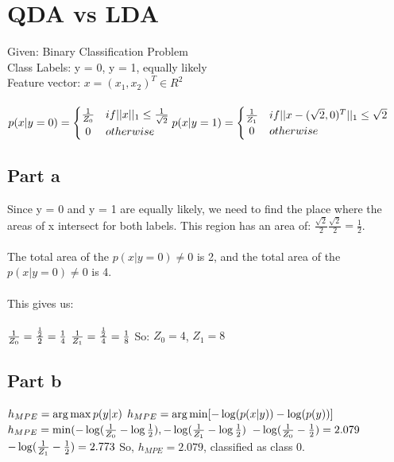 \documentclass[paper=a4, fontsize=11pt]{scrartcl} %
\numberwithin{equation}{section} %
\numberwithin{figure}{section} %
\numberwithin{table}{section} %
\begin{document}
	\section{QDA vs LDA}
	Given:
	Binary Classification Problem\\
	Class Labels: y = 0, y = 1, equally likely\\
	Feature vector: $x = (x_1, x_2)^T \in R^2$\\\\
	$
	p(x|y=0) = 
	\begin{cases}
		\hfill \frac{1}{Z_0} \hfill & if ||x||_1 \leq \frac{1}{\sqrt{2}}\\
		\hfill 0 \hfill & otherwise \\
	\end{cases}
	\\\\p(x|y=1) = 
	\begin{cases}
		\hfill \frac{1}{Z_1} \hfill & if ||x-(\sqrt{2},0)^T||_1 \leq \sqrt{2}\\
		\hfill 0 \hfill & otherwise 
	\end{cases}
	$
	
	\subsection{Part a}
	
	Since y = 0 and y = 1 are equally likely, we need to find the place where the areas of x intersect for both labels. This region has an area of: $\frac{\sqrt{2}}{2}\frac{\sqrt{2}}{2} = \frac{1}{2}$.\\\\
	The total area of the $p(x|y=0) \ne 0$ is 2, and the total area of the $p(x|y=0) \ne 0$ is 4.\\\\
	This gives us:\\\\
	$\frac{1}{Z_0} = \frac{\frac{1}{2}}{2} = \frac{1}{4}\\\\$
	$\frac{1}{Z_1} = \frac{\frac{1}{2}}{4} = \frac{1}{8}\\\\$
	So: $Z_0 = 4$, $Z_1 = 8$
		
	\subsection{Part b}
	$h_{MPE} = \arg\max p(y|x)\\\\$
	$h_{MPE} = \arg \min[-\log(p(x|y)) - \log(p(y))]\\\\$
	$h_{MPE} = \min(-\log(\frac{1}{Z_0}-\log\frac{1}{2}), -\log(\frac{1}{Z_1}-\log\frac{1}{2})\\\\$
	$-\log(\frac{1}{Z_0}-\frac{1}{2}) = 2.079\\\\$
	$-\log(\frac{1}{Z_1}-\frac{1}{2}) = 2.773\\\\$
	So, $h_{MPE} = 2.079$, classified as class 0.
	
\end{document}
